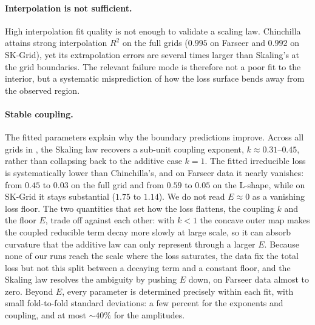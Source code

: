\documentclass[]{fairmeta}
\newcommand{\ska}{Skaling}
\begin{document}
\paragraph{Interpolation is not sufficient.}
High interpolation fit quality is not enough to validate a scaling law. Chinchilla attains strong interpolation $R^2$ on the full grids ($0.995$ on Farseer and $0.992$ on SK-Grid), yet its extrapolation errors are several times larger than \ska{}'s at the grid boundaries. The relevant failure mode is therefore not a poor fit to the interior, but a systematic misprediction of how the loss surface bends away from the observed region.

\paragraph{Stable coupling.}
The fitted parameters explain why the boundary predictions improve. Across all grids in , the \ska{} law recovers a sub-unit coupling exponent, $k\approx0.31$--$0.45$, rather than collapsing back to the additive case $k=1$. The fitted irreducible loss is systematically lower than Chinchilla's, and on Farseer data it nearly vanishes: from $0.45$ to $0.03$ on the full grid and from $0.59$ to $0.05$ on the L-shape, while on SK-Grid it stays substantial ($1.75$ to $1.14$). We do not read $E\approx0$ as a vanishing loss floor. The two quantities that set how the loss flattens, the coupling $k$ and the floor $E$, trade off against each other: with $k<1$ the concave outer map makes the coupled reducible term decay more slowly at large scale, so it can absorb curvature that the additive law can only represent through a larger $E$. Because none of our runs reach the scale where the loss saturates, the data fix the total loss but not this split between a decaying term and a constant floor, and the \ska{} law resolves the ambiguity by pushing $E$ down, on Farseer data almost to zero. Beyond $E$, every parameter is determined precisely within each fit, with small fold-to-fold standard deviations: a few percent for the exponents and coupling, and at most $\sim\!40\%$ for the amplitudes.
\end{document}
